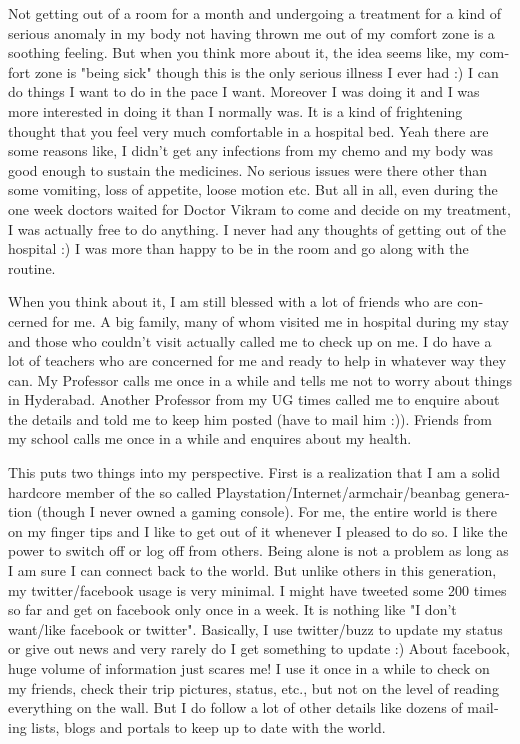 \begin{english}
Not getting out of a room for a month and undergoing a treatment for a kind of serious anomaly in my body not 
having thrown me out of my comfort zone is a soothing feeling. But when you think more about it, the idea seems 
like, my comfort zone is "being sick" though this is the only serious illness I ever had :) I can do things I want to 
do in the pace I want. Moreover I was doing it and I was more interested in doing it than I normally was. It is a 
kind of frightening thought that you feel very much comfortable in a hospital bed. Yeah there are some reasons 
like, I didn't get any infections from my chemo and my body was good enough to sustain the medicines. No serious 
issues were there other than some vomiting, loss of appetite, loose motion etc. But all in all, even during the one 
week doctors waited for Doctor Vikram to come and decide on my treatment, I was actually free to do anything. 
I never had any thoughts of getting out of the hospital :) I was more than happy to be in the room and go along 
with the routine. 

When you think about it, I am still blessed with a lot of friends who are concerned for me. A big family, many of 
whom visited me in hospital during my stay and those who couldn't visit actually called me to check up on me. 
I do have a lot of teachers who are concerned for me and ready to help in whatever way they can. My Professor 
calls me once in a while and tells me not to worry about things in Hyderabad. Another Professor from my UG times 
called me to enquire about the details and told me to keep him posted (have to mail him :)). Friends from my 
school calls me once in a while and enquires about my health.

This puts two things into my perspective. First is a realization that I am a solid hardcore member of the so called 
Playstation/Internet/armchair/beanbag generation (though I never owned a gaming console). For me, the entire 
world is there on my finger tips and I like to get out of it whenever I pleased to do so. I like the power to switch off 
or log off from others. Being alone is not a problem as long as I am sure I can connect back to the world. But unlike 
others in this generation, my twitter/facebook usage is very minimal. I might have tweeted some 200 times so far 
and get on facebook only once in a week. It is nothing like "I don't want/like facebook or twitter". Basically, I use 
twitter/buzz to update my status or give out news and very rarely do I get something to update :) About facebook, 
huge volume of information just scares me! I use it once in a while to check on my friends, check their trip pictures, 
status, etc., but not on the level of reading everything on the wall. But I do follow a lot of other details like dozens 
of mailing lists, blogs and portals to keep up to date with the world. 


\end{english}
